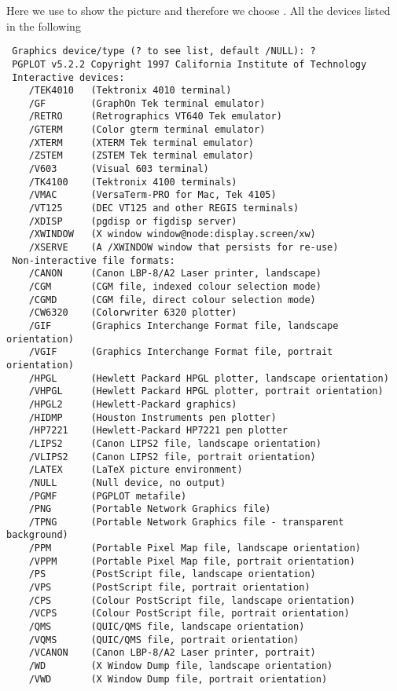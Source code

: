 \documentclass[a4paper,11pt]{article}
\begin{document}
\par Here we use  to show the picture and therefore we choose . All the devices listed in the following
\begin{lstlisting}
 Graphics device/type (? to see list, default /NULL): ?
 PGPLOT v5.2.2 Copyright 1997 California Institute of Technology
 Interactive devices:
    /TEK4010   (Tektronix 4010 terminal)
    /GF        (GraphOn Tek terminal emulator)
    /RETRO     (Retrographics VT640 Tek emulator)
    /GTERM     (Color gterm terminal emulator)
    /XTERM     (XTERM Tek terminal emulator)
    /ZSTEM     (ZSTEM Tek terminal emulator)
    /V603      (Visual 603 terminal)
    /TK4100    (Tektronix 4100 terminals)
    /VMAC      (VersaTerm-PRO for Mac, Tek 4105)
    /VT125     (DEC VT125 and other REGIS terminals)
    /XDISP     (pgdisp or figdisp server)
    /XWINDOW   (X window window@node:display.screen/xw)
    /XSERVE    (A /XWINDOW window that persists for re-use)
 Non-interactive file formats:
    /CANON     (Canon LBP-8/A2 Laser printer, landscape)
    /CGM       (CGM file, indexed colour selection mode)
    /CGMD      (CGM file, direct colour selection mode)
    /CW6320    (Colorwriter 6320 plotter)
    /GIF       (Graphics Interchange Format file, landscape orientation)
    /VGIF      (Graphics Interchange Format file, portrait orientation)
    /HPGL      (Hewlett Packard HPGL plotter, landscape orientation)
    /VHPGL     (Hewlett Packard HPGL plotter, portrait orientation)
    /HPGL2     (Hewlett-Packard graphics)
    /HIDMP     (Houston Instruments pen plotter)
    /HP7221    (Hewlett-Packard HP7221 pen plotter
    /LIPS2     (Canon LIPS2 file, landscape orientation)
    /VLIPS2    (Canon LIPS2 file, portrait orientation)
    /LATEX     (LaTeX picture environment)
    /NULL      (Null device, no output)
    /PGMF      (PGPLOT metafile)
    /PNG       (Portable Network Graphics file)
    /TPNG      (Portable Network Graphics file - transparent background)
    /PPM       (Portable Pixel Map file, landscape orientation)
    /VPPM      (Portable Pixel Map file, portrait orientation)
    /PS        (PostScript file, landscape orientation)
    /VPS       (PostScript file, portrait orientation)
    /CPS       (Colour PostScript file, landscape orientation)
    /VCPS      (Colour PostScript file, portrait orientation)
    /QMS       (QUIC/QMS file, landscape orientation)
    /VQMS      (QUIC/QMS file, portrait orientation)
    /VCANON    (Canon LBP-8/A2 Laser printer, portrait)
    /WD        (X Window Dump file, landscape orientation)
    /VWD       (X Window Dump file, portrait orientation)
\end{lstlisting}
\end{document}
